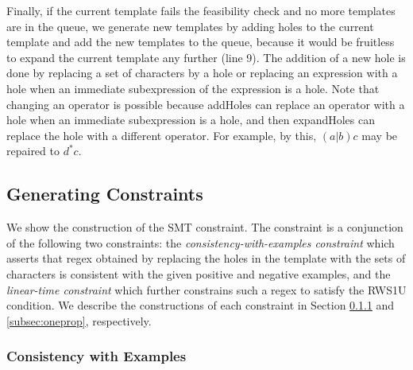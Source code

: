 \documentclass[conference]{IEEEtran}
\newcommand{\ltp}{RWS1U}
\begin{document}
Finally, if the current template fails the feasibility check and no more templates are in the queue, we generate new templates by adding holes to the current template and add the new templates to the queue, because it would be fruitless to expand the current template any further (line 9).  The addition of a new hole is done by replacing a set of characters by a hole or replacing an expression with a hole when an immediate subexpression of the expression is a hole.
Note that changing an operator is possible because {\sf addHoles} can replace an operator with a hole when an immediate subexpression is a hole, and then {\sf expandHoles} can replace the hole with a different operator. For example, by this, $(a|b)c$ may be repaired to $d^*c$.






\subsection{Generating Constraints}
\label{subsec:genconst}
We show the construction of the SMT constraint.  The constraint is a conjunction of the following two constraints: the {\em consistency-with-examples constraint} which asserts that regex obtained by replacing the holes in the template with the sets of characters is consistent with the given positive and negative examples, and the {\em linear-time constraint} which further constrains such a regex to satisfy the \ltp{} condition. 
We describe the constructions of each constraint in Section \ref{subsec:consthole} and \ref{subsec:oneprop}, respectively.






\subsubsection{Consistency with Examples}
\label{subsec:consthole}
\end{document}
